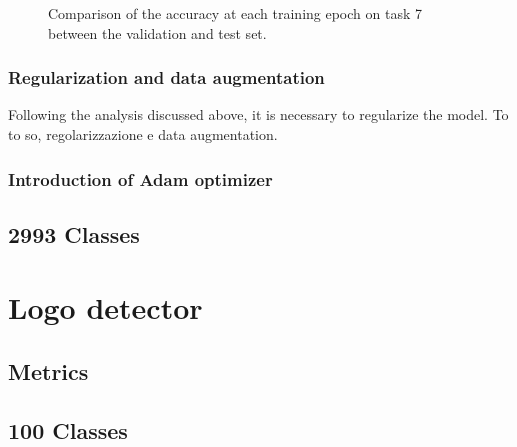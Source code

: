 \begin{figure}[H]
	\centering
	\caption{Comparison of the accuracy at each training epoch on task 7 between the validation and test set.}%
	\label{fig:exp1-train_val}%
\end{figure}

\subsubsection{Regularization and data augmentation}
Following the analysis discussed above, it is necessary to regularize the model.
To to so, regolarizzazione e data augmentation.

\subsubsection{Introduction of Adam optimizer}

\subsection{2993 Classes}
\label{sec:whole_dataset_clf}
\section{Logo detector}
\label{sec:exp-det}
\subsection{Metrics}
\subsection{100 Classes}
